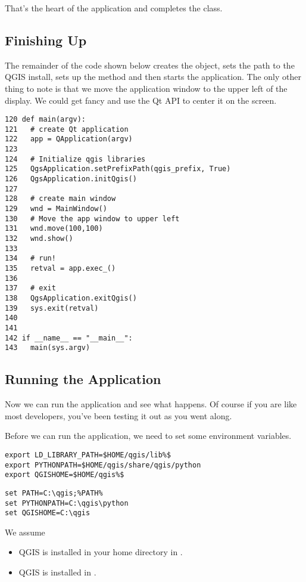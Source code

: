 That's the heart of the application and completes the  class. 

\subsection{Finishing Up}

The remainder of the code shown below creates the 
object, sets the path to the QGIS install, sets up the  method
and then starts the application. The only other thing to note is that we move
the application window to the upper left of the display. We could get fancy
and use the Qt API to center it on the screen.

\begin{verbatim}
120 def main(argv):
121   # create Qt application
122   app = QApplication(argv)
123 
124   # Initialize qgis libraries
125   QgsApplication.setPrefixPath(qgis_prefix, True)
126   QgsApplication.initQgis()
127 
128   # create main window
129   wnd = MainWindow()
130   # Move the app window to upper left
131   wnd.move(100,100)
132   wnd.show()
133 
134   # run!
135   retval = app.exec_()
136   
137   # exit
138   QgsApplication.exitQgis()
139   sys.exit(retval)
140 
141 
142 if __name__ == "__main__":
143   main(sys.argv)
\end{verbatim}

\subsection{Running the Application}

Now we can run the application and see what happens. Of course if you are like 
most developers, you've been testing it out as you went along. 

Before we can run the application, we need to set some environment variables. 

\nix{}\osx{}
\begin{verbatim}
export LD_LIBRARY_PATH=$HOME/qgis/lib%$
export PYTHONPATH=$HOME/qgis/share/qgis/python
export QGISHOME=$HOME/qgis%$
\end{verbatim}

\win{}
\begin{verbatim}
set PATH=C:\qgis;%PATH%
set PYTHONPATH=C:\qgis\python
set QGISHOME=C:\qgis
\end{verbatim}

We assume
\begin{itemize}
\item\nix{}\osx{}QGIS is installed in 
your home directory in 
. 
\item\win{}QGIS is installed in .
\end{itemize}

